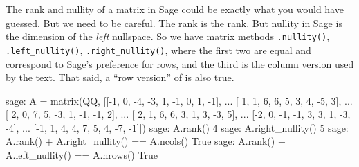 The rank and nullity of a matrix in Sage could be exactly what you would have guessed.  But we need to be careful.  The rank is the rank.  But nullity in Sage is the dimension of the \emph{left} nullspace.  So we have matrix methods \verb?.nullity()?, \verb?.left_nullity()?, \verb?.right_nullity()?, where the first two are equal and correspond to Sage's preference for rows, and the third is the column version used by the text.  That said, a ``row version'' of  is also true.
%
\begin{sageexample}
sage: A = matrix(QQ, [[-1, 0, -4, -3,  1, -1,  0,  1, -1],
...                   [ 1, 1,  6,  6,  5,  3,  4, -5,  3],
...                   [ 2, 0,  7,  5, -3,  1, -1, -1,  2],
...                   [ 2, 1,  6,  6,  3,  1,  3, -3,  5],
...                   [-2, 0, -1, -1,  3,  3,  1, -3, -4],
...                   [-1, 1,  4,  4,  7,  5,  4, -7, -1]])
sage: A.rank()
4
sage: A.right_nullity()
5
sage: A.rank() + A.right_nullity() == A.ncols()
True
sage: A.rank() + A.left_nullity() == A.nrows()
True
\end{sageexample}
%
\begin{sageverbatim}
\end{sageverbatim}
%
